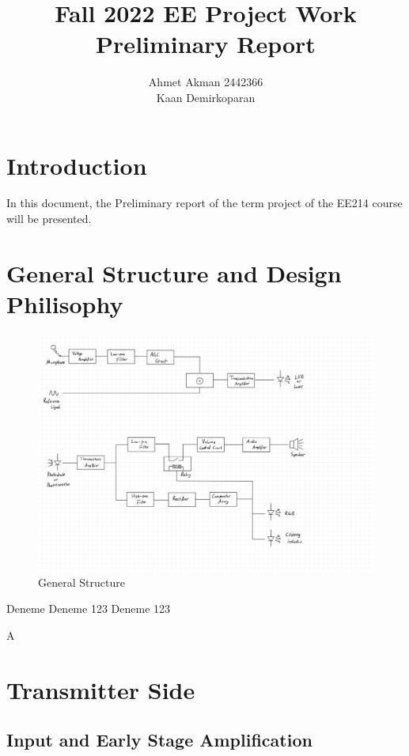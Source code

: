 \documentclass[a4paper,10pt]{report}
\begin{document}
\thispagestyle{empty}

\title{  Fall 2022 EE Project Work  \protect\\ Preliminary Report}
\author{ Ahmet Akman 2442366 \protect\\ Kaan Demirkoparan}
\date{}
\maketitle
\section{Introduction}
In this document, the Preliminary report of the term project of the EE214 course will be presented. 
\section{General Structure and Design Philisophy}
\begin{figure}[h]
    \centering
    \includegraphics[width = 1\textwidth]{general_structure.jpeg}
    \caption{General Structure}
\end{figure} 
Deneme
Deneme 123 Deneme 123

A

\section{Transmitter Side}
\subsection{Input and Early Stage Amplification}
\end{document}
